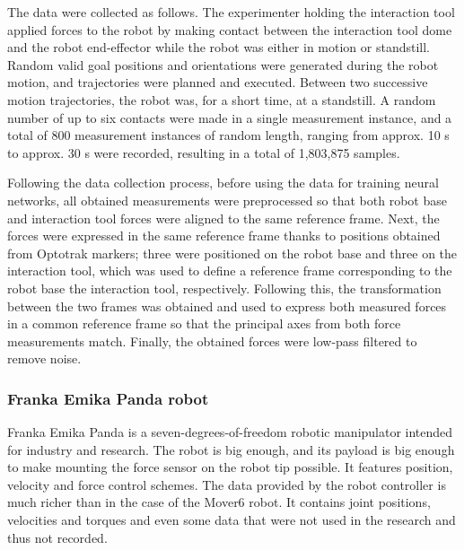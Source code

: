 The data were collected as follows. The experimenter holding the interaction tool applied forces to the robot by making contact between the interaction tool dome and the robot end-effector while the robot was either in motion or standstill. Random valid goal positions and orientations were generated during the robot motion, and trajectories were planned and executed. Between two successive motion trajectories, the robot was, for a short time, at a standstill. A random number of up to six contacts were made in a single measurement instance, and a total of 800 measurement instances of random length, ranging from approx. 10 s to approx. 30 s were recorded, resulting in a total of 1,803,875 samples. 

Following the data collection process, before using the data for training neural networks, all obtained measurements were preprocessed so that both robot base and interaction tool forces were aligned to the same reference frame. Next, the forces were expressed in the same reference frame thanks to positions obtained from Optotrak markers; three were positioned on the robot base and three on the interaction tool, which was used to define a reference frame corresponding to the robot base the interaction tool, respectively. Following this, the transformation between the two frames was obtained and used to express both measured forces in a common reference frame so that the principal axes from both force measurements match. Finally, the obtained forces were low-pass filtered to remove noise.

\subsubsection{Franka Emika Panda robot}

Franka Emika Panda \cite{FrankaRobot} is a seven-degrees-of-freedom robotic manipulator intended for industry and research. The robot is big enough, and its payload is big enough to make mounting the force sensor on the robot tip possible. It features position, velocity and force control schemes. The data provided by the robot controller is much richer than in the case of the Mover6 robot. It contains joint positions, velocities and torques and even some data that were not used in the research and thus not recorded.

